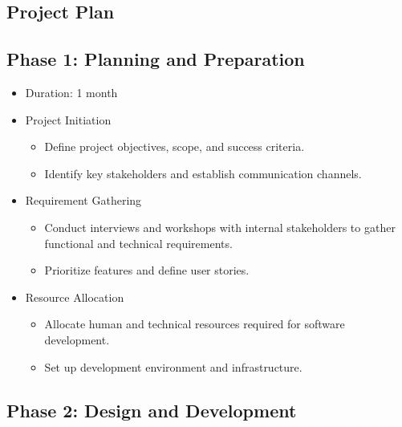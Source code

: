 \documentclass[12pt]{article}
\begin{document}
\subsection*{Project Plan }

{
\subsection*{\fontsize{13}{0}\selectfont Phase 1: Planning and Preparation}
}

\begin{itemize}
    \item Duration: 1 month
    \item Project Initiation
        \begin{itemize}
            \item Define project objectives, scope, and success criteria.
            \item Identify key stakeholders and establish communication channels.
        \end{itemize}
    \item Requirement Gathering
        \begin{itemize}
            \item Conduct interviews and workshops with internal stakeholders to gather functional and technical requirements.
            \item Prioritize features and define user stories.
        \end{itemize}
    \item Resource Allocation
        \begin{itemize}
            \item Allocate human and technical resources required for software development.
            \item Set up development environment and infrastructure.
        \end{itemize}
\end{itemize}

\subsection*{\fontsize{13}{0}\selectfont Phase 2: Design and Development}
\end{document}
